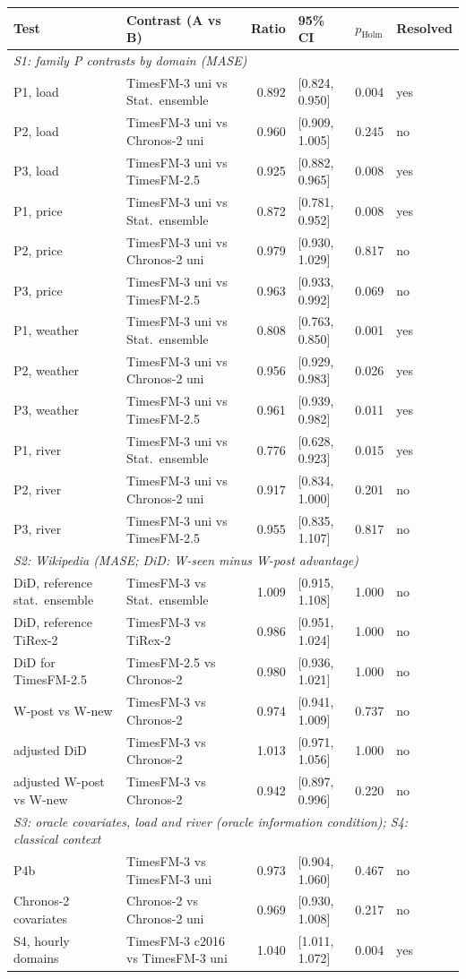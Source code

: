 \begin{tabular}{llrlll}
\toprule
Test & Contrast (A vs B) & Ratio & 95\% CI & $p_{\mathrm{Holm}}$ & Resolved \\
\midrule
\multicolumn{6}{l}{\textit{S1: family P contrasts by domain (MASE)}} \\
P1, load & TimesFM-3 uni vs Stat.\ ensemble & 0.892 & [0.824, 0.950] & 0.004 & yes \\
P2, load & TimesFM-3 uni vs Chronos-2 uni & 0.960 & [0.909, 1.005] & 0.245 & no \\
P3, load & TimesFM-3 uni vs TimesFM-2.5 & 0.925 & [0.882, 0.965] & 0.008 & yes \\
P1, price & TimesFM-3 uni vs Stat.\ ensemble & 0.872 & [0.781, 0.952] & 0.008 & yes \\
P2, price & TimesFM-3 uni vs Chronos-2 uni & 0.979 & [0.930, 1.029] & 0.817 & no \\
P3, price & TimesFM-3 uni vs TimesFM-2.5 & 0.963 & [0.933, 0.992] & 0.069 & no \\
P1, weather & TimesFM-3 uni vs Stat.\ ensemble & 0.808 & [0.763, 0.850] & 0.001 & yes \\
P2, weather & TimesFM-3 uni vs Chronos-2 uni & 0.956 & [0.929, 0.983] & 0.026 & yes \\
P3, weather & TimesFM-3 uni vs TimesFM-2.5 & 0.961 & [0.939, 0.982] & 0.011 & yes \\
P1, river & TimesFM-3 uni vs Stat.\ ensemble & 0.776 & [0.628, 0.923] & 0.015 & yes \\
P2, river & TimesFM-3 uni vs Chronos-2 uni & 0.917 & [0.834, 1.000] & 0.201 & no \\
P3, river & TimesFM-3 uni vs TimesFM-2.5 & 0.955 & [0.835, 1.107] & 0.817 & no \\
\midrule
\multicolumn{6}{l}{\textit{S2: Wikipedia (MASE; DiD: W-seen minus W-post advantage)}} \\
DiD, reference stat.\ ensemble & TimesFM-3 vs Stat.\ ensemble & 1.009 & [0.915, 1.108] & 1.000 & no \\
DiD, reference TiRex-2 & TimesFM-3 vs TiRex-2 & 0.986 & [0.951, 1.024] & 1.000 & no \\
DiD for TimesFM-2.5 & TimesFM-2.5 vs Chronos-2 & 0.980 & [0.936, 1.021] & 1.000 & no \\
W-post vs W-new & TimesFM-3 vs Chronos-2 & 0.974 & [0.941, 1.009] & 0.737 & no \\
adjusted DiD & TimesFM-3 vs Chronos-2 & 1.013 & [0.971, 1.056] & 1.000 & no \\
adjusted W-post vs W-new & TimesFM-3 vs Chronos-2 & 0.942 & [0.897, 0.996] & 0.220 & no \\
\midrule
\multicolumn{6}{l}{\textit{S3: oracle covariates, load and river (oracle information condition); S4: classical context}} \\
P4b & TimesFM-3 vs TimesFM-3 uni & 0.973 & [0.904, 1.060] & 0.467 & no \\
Chronos-2 covariates & Chronos-2 vs Chronos-2 uni & 0.969 & [0.930, 1.008] & 0.217 & no \\
S4, hourly domains & TimesFM-3 c2016 vs TimesFM-3 uni & 1.040 & [1.011, 1.072] & 0.004 & yes \\
\bottomrule
\end{tabular}
